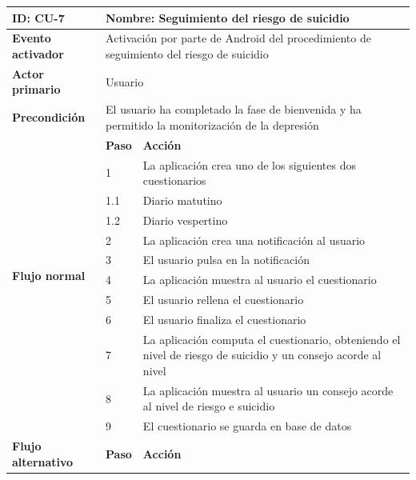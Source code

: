             \begin{table}[h]
                \centering
                \begin{tabularx}{\textwidth}{|l|l|X|}
                    \hline
                    \textbf{ID:} CU-7 & \multicolumn{2}{|X|}{\textbf{Nombre}: Seguimiento del riesgo de suicidio} \\
                    \hline
                    \textbf{Evento activador} & \multicolumn{2}{|X|}{Activación por parte de Android del procedimiento de seguimiento del riesgo de suicidio} \\
                    \hline
                    \textbf{Actor primario} & \multicolumn{2}{|X|}{Usuario} \\
                    \hline
                    \textbf{Precondición} & \multicolumn{2}{|X|}{El usuario ha completado la fase de bienvenida y ha permitido la monitorización de la depresión} \\
                    \hline
                    \multirow{11}{*}{\textbf{Flujo normal}} & \textbf{Paso} & \textbf{Acción} \\
                    \cline{2-3} & 1 & La aplicación crea uno de los siguientes dos cuestionarios \\
                    \cline{2-3} & 1.1 & Diario matutino \\
                    \cline{2-3} & 1.2 & Diario vespertino \\
                    \cline{2-3} & 2 & La aplicación crea una notificación al usuario \\
                    \cline{2-3} & 3 & El usuario pulsa en la notificación \\
                    \cline{2-3} & 4 & La aplicación muestra al usuario el cuestionario \\
                    \cline{2-3} & 5 & El usuario rellena el cuestionario \\
                    \cline{2-3} & 6 & El usuario finaliza el cuestionario \\
                    \cline{2-3} & 7 & La aplicación computa el cuestionario, obteniendo el nivel de riesgo de suicidio y un consejo acorde al nivel \\
                    \cline{2-3} & 8 & La aplicación muestra al usuario un consejo acorde al nivel de riesgo e suicidio \\
                    \cline{2-3} & 9 & El cuestionario se guarda en base de datos \\
                    \hline
                    \multirow{6}{*}{\textbf{Flujo alternativo}} & \textbf{Paso} & \textbf{Acción} \\

\end{tabularx}
\end{table}
